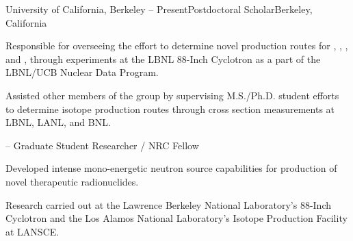 \begin{rSubsection}{University of California, Berkeley}{ -- Present}{Postdoctoral Scholar}{Berkeley, California}
\item Responsible for overseeing the effort to determine novel production routes for , , , and , through experiments at the LBNL 88-Inch Cyclotron as a part of the LBNL/UCB Nuclear Data Program.
\item Assisted other members of the group by supervising M.S./Ph.D. student efforts to determine isotope production routes through cross section measurements at LBNL, LANL, and BNL.
\end{rSubsection}\vspace{-1.5\baselineskip}
\begin{rSubsection}{}{ -- }{Graduate Student Researcher / NRC Fellow}{}
  \fi 
{}  \else \fi
\item  Developed intense mono-energetic neutron source capabilities for production of novel therapeutic radionuclides.
\item  Research carried out at 
the Lawrence Berkeley National Laboratory's 88-Inch Cyclotron and the Los Alamos National Laboratory's  Isotope Production Facility at LANSCE.
\end{rSubsection}

